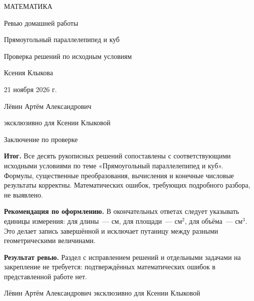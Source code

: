 \documentclass[a4paper,12pt]{article}
\begin{document}
\begin{titlepage}
\centering
\vspace*{31mm}
{\large\color{accent} МАТЕМАТИКА\par}
\vspace{19mm}
{\LARGE Ревью домашней работы\par}
\vspace{17mm}
{\Large\color{accent} Прямоугольный параллелепипед и куб\par}
\vspace{18mm}
{\normalsize Проверка решений по исходным условиям\par}
\vfill
{\large Ксения Клыкова\par}
\vspace{11mm}
{\normalsize 21 ноября 2026 г.\par}
\vspace{22mm}
{\small Лёвин Артём Александрович\par}
{\small эксклюзивно для Ксении Клыковой\par}
\vspace{13mm}
\vspace{10mm}
\end{titlepage}
\newpage
\thispagestyle{empty}
\vspace*{18mm}
\begin{center}
{\Large\color{accent} Заключение по проверке}
\end{center}
\vspace{13mm}
\textbf{Итог.}
Все десять рукописных решений сопоставлены с соответствующими
исходными условиями по теме «Прямоугольный параллелепипед и куб».
Формулы, существенные преобразования, вычисления и конечные
числовые результаты корректны. Математических ошибок, требующих
подробного разбора, не выявлено.

\vspace{9mm}
\textbf{Рекомендация по оформлению.}
В окончательных ответах следует указывать единицы измерения:
для длины~--- см, для площади~--- см$^2$, для объёма~--- см$^3$.
Это делает запись завершённой и исключает путаницу между
разными геометрическими величинами.

\vspace{9mm}
\textbf{Результат ревью.}
Раздел с исправлением решений и отдельными задачами на
закрепление не требуется: подтверждённых математических
ошибок в представленной работе нет.

\vfill
\begin{center}
{\small\color{textgray}Лёвин Артём Александрович эксклюзивно для Ксении Клыковой}
\end{center}
\end{document}

